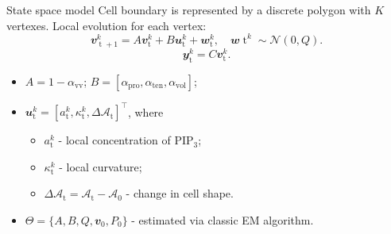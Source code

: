 \documentclass[mathserif,11pt]{beamer}
\DeclareMathOperator{\td}{\mathrm{t}}
\begin{document}
\begin{frame}{State space model}
Cell boundary is represented by a discrete polygon with $K$ vertexes. Local evolution for each vertex:
\begin{equation*}
\mathbfit{v}_{\td+1}^{k} = A\mathbfit{v}_{\td}^{k} + B\mathbfit{u}_{\td}^{k}+ \mathbfit{w}_{\td}^{k}, \quad \mathbfit{w}{\td}^{k} \sim \mathcal{N}(0,Q).
\end{equation*}
\begin{equation*}
\mathbfit{y}_{\td}^{k} = C \mathbfit{v}_{\td}^{k}.
\end{equation*}
\begin{itemize}
\item 
$A = 1 - \alpha_{\textrm{vv}}$;
$B = \left[\alpha_{\textrm{pro}}, \alpha_{\textrm{ten}}, \alpha_{\textrm{vol}}\right]$;
\item 
$\mathbfit{u}_{\td}^{k} =\left[  a_{\td}^{k}, \kappa_{\td}^{k}, \Delta\mathcal{A}_{\td} \right] ^\top$, where
	\begin{itemize}
		\item $a_{\td}^{k}$ - local concentration of PIP$_3$;
		\item $\kappa_{\td}^{k}$ - local curvature;
		\item $\Delta\mathcal{A}_{\td} = \mathcal{A}_{\td} - \mathcal{A}_0$ - change in cell shape. 
	\end{itemize}
\item $\Theta = \lbrace A, B, Q, \mathbfit{v}_0, P_0 \rbrace$ - estimated via classic EM algorithm.
\end{itemize}
\end{frame}


\end{document}
